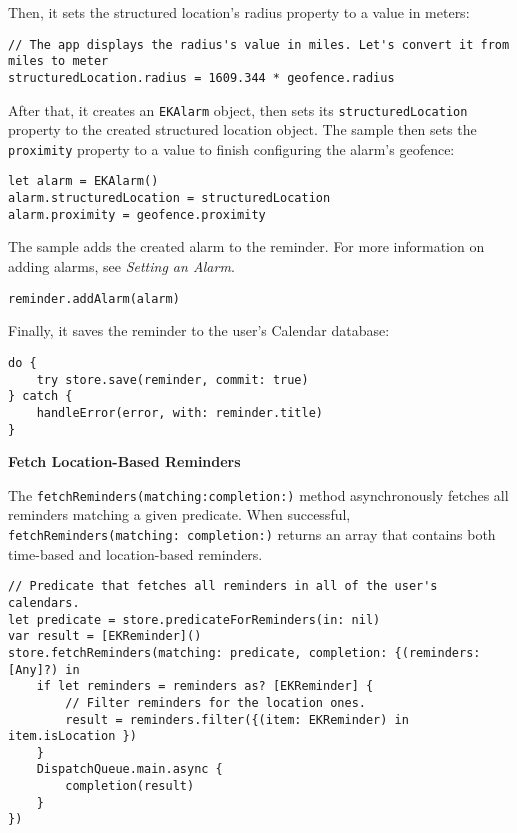 \documentclass{article}
\begin{document}
Then, it sets the structured location's radius property to a value in meters:

\begin{verbatim}
// The app displays the radius's value in miles. Let's convert it from miles to meter
structuredLocation.radius = 1609.344 * geofence.radius
\end{verbatim}

After that, it creates an \texttt{EKAlarm} object, then sets its \texttt{structuredLocation} property to the created structured
location object. The sample then sets the \texttt{proximity} property to a value to finish configuring the alarm's
geofence:

\begin{verbatim}
let alarm = EKAlarm()
alarm.structuredLocation = structuredLocation
alarm.proximity = geofence.proximity
\end{verbatim}

The sample adds the created alarm to the reminder. For more information on adding alarms, see \textit{Setting an
Alarm}.

\begin{verbatim}
reminder.addAlarm(alarm)
\end{verbatim}

Finally, it saves the reminder to the user's Calendar database:

\begin{verbatim}
do {
    try store.save(reminder, commit: true)
} catch {
    handleError(error, with: reminder.title)
}
\end{verbatim}

\textbf{Fetch Location-Based Reminders}

The \texttt{fetchReminders(matching:completion:)} method asynchronously fetches all reminders matching a
given predicate. When successful, \texttt{fetchReminders(matching: completion:)} returns an array that
contains both time-based and location-based reminders.

\begin{verbatim}
// Predicate that fetches all reminders in all of the user's calendars.
let predicate = store.predicateForReminders(in: nil)
var result = [EKReminder]()
store.fetchReminders(matching: predicate, completion: {(reminders: [Any]?) in
    if let reminders = reminders as? [EKReminder] {
        // Filter reminders for the location ones.
        result = reminders.filter({(item: EKReminder) in item.isLocation })
    }
    DispatchQueue.main.async {
        completion(result)
    }
})
\end{verbatim}
\end{document}
